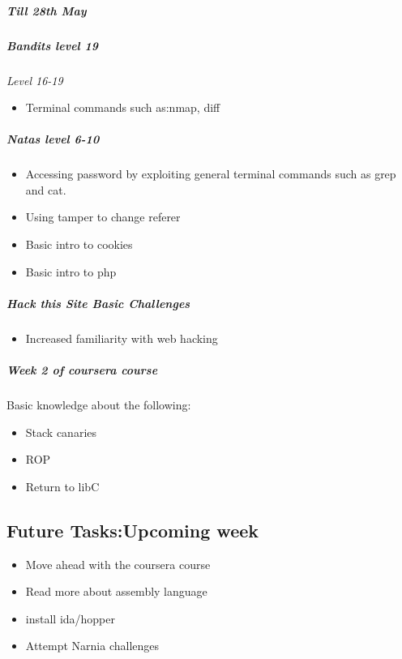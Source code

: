 \documentclass{article}
\begin{document}
\subparagraph{\textit{Till 28th May}}
\subparagraph{Bandits level 19}
    \textit{Level 16-19}
    \begin{itemize}
        \item Terminal commands such as:nmap, diff
    \end{itemize}

\subparagraph{Natas level 6-10}
    \begin{itemize}
        \item Accessing password by exploiting general terminal commands such as grep and cat.
        \item Using tamper to change referer 
        \item Basic intro to cookies
        \item Basic intro to php
    \end{itemize}    
\subparagraph{Hack this Site Basic Challenges}
    \begin{itemize}
        \item Increased familiarity with web hacking
    \end{itemize} 
\subparagraph{Week 2 of coursera course}
    Basic knowledge about the following:
    \begin{itemize}
        \item Stack canaries
        \item ROP
        \item Return to libC
    \end{itemize} 

\subsection*{Future Tasks:Upcoming week}
\begin{itemize}
    \item Move ahead with the coursera course
    \item Read more about assembly language
    \item install ida/hopper
    \item Attempt Narnia challenges
\end{itemize}
\end{document}

